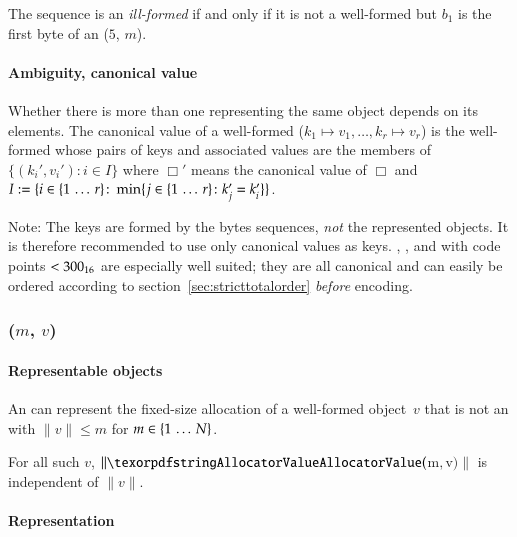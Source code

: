 The sequence is an \emph{ill-formed} \DborDictionaryValue{} if and only if it is not a well-formed
\DborDictionaryValue{} but $b_1$ is the first byte of an \DborIntegerToken*($5$, $m$).


\paragraph{Ambiguity, canonical value}

Whether there is more than one \DborDictionaryValue{} representing the same object depends on its elements.
The canonical value of a well-formed \DborDictionaryValue($k_1 \mapsto v_1, \ldots, k_r \mapsto v_r$) is
the well-formed \DborDictionaryValue{} whose pairs of keys and associated values are the members of
$\{(k_i', v_i') \colon i \in I\}$ where $\Box'$ means the canonical value of $\Box$ and
$I := \{i \in \{1 \,\ldots\, r\}\colon \min\{j \in \{1 \,\ldots\, r\}\colon k_j' = k_i'\}\}$.

\medskip
Note:
The keys are formed by the bytes sequences, \emph{not} the represented objects.
It is therefore recommended to use only canonical values as keys.
\DborIntegerValue{}, \DborByteStringValue{}, and \DborUtfEightStringValue{} with code points $< \mathrm{300}_{16}$
are especially well suited; they are all canonical and can easily be ordered according to
section~\ref{sec:stricttotalorder} \emph{before} encoding.


\subsubsection{\DborAllocatorValue(\texorpdfstring{$m$, $v$}{m, v})}
\hypertarget{sec:def:AllocatorValue}{}

\paragraph{Representable objects}

An \DborAllocatorValue{} can represent the fixed-size allocation of a well-formed object~$v$
that is not an \DborAllocatorValue with $\|v\| \le m$ for $m \in \{1 \,\ldots\, N\}$.

For all such $v$, $\|\DborAllocatorValue($m$,{} $v$)\|$ is independent of $\|v\|$.

\paragraph{Representation}

